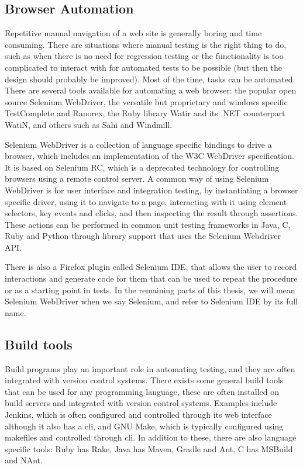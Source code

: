 \documentclass[11pt]{article}
\begin{document}
\subsection{Browser Automation}
\label{subsec:browserautomation}

Repetitive manual navigation of a web site is generally boring and time consuming. There are situations where manual testing is the right thing to do, such as when there is no need for regression testing or the functionality is too complicated to interact with for automated tests to be possible (but then the design should probably be improved). Most of the time, tasks can be automated. There are several tools available for automating a web browser: the popular open source Selenium WebDriver, the versatile but proprietary and windows specific TestComplete and Ranorex, the Ruby library Watir and its .NET counterpart WatiN, and others such as Sahi and Windmill.

Selenium WebDriver is a collection of language specific bindings to drive a browser, which includes an implementation of the W3C WebDriver specification. It is based on Selenium RC, which is a deprecated technology for controlling browsers using a remote control server. A common way of using Selenium WebDriver is for user interface and integration testing, by instantiating a browser specific driver, using it to navigate to a page, interacting with it using element selectors, key events and clicks, and then inspecting the result through assertions. These actions can be performed in common unit testing frameworks in Java, C\nolinebreak\hspace{-.05em}\raisebox{.3ex}{\scriptsize\bf \#}, Ruby and Python through library support that uses the Selenium Webdriver API. \cite{Selenium}\cite{Selenium2}

There is also a Firefox plugin called Selenium IDE, that allows the user to record interactions and generate code for them that can be used to repeat the procedure or as a starting point in tests. In the remaining parts of this thesis, we will mean Selenium WebDriver when we say Selenium, and refer to Selenium IDE by its full name.

\subsection{Build tools}
\label{subsec:build}

Build programs play an important role in automating testing, and they are often integrated with version control systems. There exists some general build tools that can be used for any programming language, these are often installed on build servers and integrated with version control systems. Examples include Jenkins, which is often configured and controlled through its web interface although it also has a \gls{cli}, and GNU Make, which is typically configured using makefiles and controlled through \gls{cli}. In addition to these, there are also language specific tools: Ruby has Rake, Java has Maven, Gradle and Ant, C\nolinebreak\hspace{-.05em}\raisebox{.3ex}{\scriptsize\bf \#} has MSBuild and NAnt.
\end{document}

